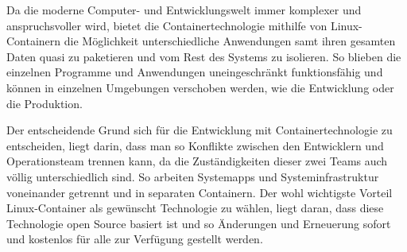 
Da die moderne Computer- und Entwicklungswelt immer komplexer und anspruchsvoller wird, bietet die Containertechnologie mithilfe von Linux-Containern die Möglichkeit unterschiedliche Anwendungen samt ihren gesamten Daten quasi zu paketieren und vom Rest des Systems zu isolieren.  So blieben die einzelnen Programme und Anwendungen uneingeschränkt funktionsfähig und können in einzelnen Umgebungen verschoben werden, wie die Entwicklung oder die Produktion.

Der entscheidende Grund sich für die Entwicklung mit Containertechnologie zu entscheiden, liegt darin, dass man so Konflikte zwischen den Entwicklern und Operationsteam trennen kann, da die Zuständigkeiten dieser zwei Teams auch völlig unterschiedlich sind. So arbeiten Systemapps und Systeminfrastruktur voneinander getrennt und in separaten Containern. Der wohl wichtigste Vorteil Linux-Container als gewünscht Technologie zu wählen, liegt daran, dass diese Technologie open Source basiert ist und so Änderungen und Erneuerung sofort und kostenlos für alle zur Verfügung gestellt werden. \cite{Container}
